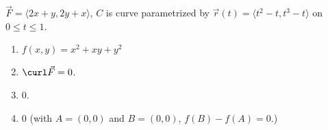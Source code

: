 {$\vec F = \langle 2x+y, 2y+x\rangle$, $C$ is curve parametrized by $\vec r(t) = \langle t^2-t, t^3-t\rangle$ on $0\leq t\leq 1$. 
}
{\begin{enumerate}
\item		$f(x,y) = x^2+xy+y^2$
\item	$\curl \vec F = 0$.
\item		$0$.%
\item	$0$ (with $A = (0,0)$ and $B = (0,0)$, $f(B) - f(A) = 0$.)
\end{enumerate}
}

